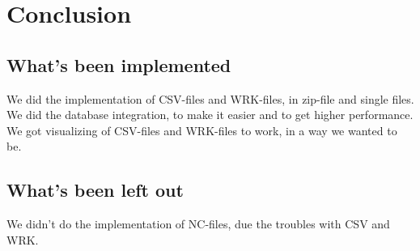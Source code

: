 \chapter{Conclusion}
\section{What's been implemented}
We did the implementation of CSV-files and WRK-files, in zip-file and single files.\\
We did the database integration, to make it easier and to get higher performance.\\
We got visualizing of CSV-files and WRK-files to work, in a way we wanted to be.\\
 
\section{What's been left out}
We didn't do the implementation of NC-files, due the troubles with CSV and WRK.\\

